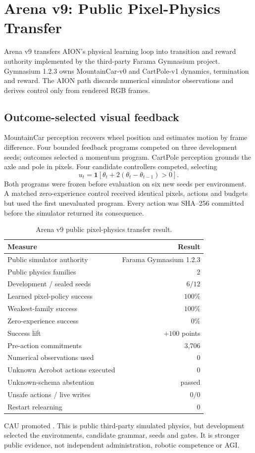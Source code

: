 \section{Arena v9: Public Pixel-Physics Transfer}
\label{sec:arena-v9-public-physics}

Arena v9 transfers AION's physical learning loop into transition and reward
authority implemented by the third-party Farama Gymnasium project. Gymnasium
1.2.3 owns MountainCar-v0 and CartPole-v1 dynamics, termination and reward.
The AION path discards numerical simulator observations and derives control
only from rendered RGB frames.

\subsection{Outcome-selected visual feedback}

MountainCar perception recovers wheel position and estimates motion by frame
difference. Four bounded feedback programs competed on three development
seeds; outcomes selected a momentum program. CartPole perception grounds the
axle and pole in pixels. Four candidate controllers competed, selecting
\begin{equation}
 u_t=\mathbf{1}\!\left[\theta_t+2(\theta_t-\theta_{t-1})>0\right].
\end{equation}
Both programs were frozen before evaluation on six new seeds per environment.
A matched zero-experience control received identical pixels, actions and
budgets but used the first unevaluated program. Every action was SHA--256
committed before the simulator returned its consequence.

\begin{table}[ht]
\centering
\small
\begin{tabular}{@{}lr@{}}
\hline
Measure & Result \\
\hline
Public simulator authority & Farama Gymnasium 1.2.3 \\
Public physics families & 2 \\
Development / sealed seeds & $6/12$ \\
Learned pixel-policy success & $100\%$ \\
Weakest-family success & $100\%$ \\
Zero-experience success & $0\%$ \\
Success lift & $+100$ points \\
Pre-action commitments & 3,706 \\
Numerical observations used & 0 \\
Unknown Acrobot actions executed & 0 \\
Unknown-schema abstention & passed \\
Unsafe actions / live writes & $0/0$ \\
Restart relearning & 0 \\
\hline
\end{tabular}
\caption{Arena v9 public pixel-physics transfer result.}
\end{table}

CAU promoted
.
This is public third-party simulated physics, but development selected the
environments, candidate grammar, seeds and gates. It is stronger public
evidence, not independent administration, robotic competence or AGI.

